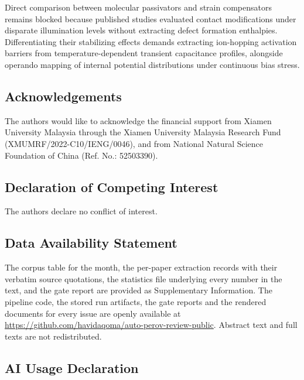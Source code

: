 \documentclass[
  11pt,
]{article}
\begin{document}
Direct comparison between molecular passivators and strain compensators
remains blocked because published studies evaluated contact
modifications under disparate illumination levels without extracting
defect formation enthalpies. Differentiating their stabilizing effects
demands extracting ion-hopping activation barriers from
temperature-dependent transient capacitance profiles, alongside operando
mapping of internal potential distributions under continuous bias
stress.

\subsection{Acknowledgements}\label{acknowledgements}

The authors would like to acknowledge the financial support from Xiamen
University Malaysia through the Xiamen University Malaysia Research Fund
(XMUMRF/2022-C10/IENG/0046), and from National Natural Science
Foundation of China (Ref. No.: 52503390).

\subsection{Declaration of Competing
Interest}\label{declaration-of-competing-interest}

The authors declare no conflict of interest.

\subsection{Data Availability
Statement}\label{data-availability-statement}

The corpus table for the month, the per-paper extraction records with
their verbatim source quotations, the statistics file underlying every
number in the text, and the gate report are provided as Supplementary
Information. The pipeline code, the stored run artifacts, the gate
reports and the rendered documents for every issue are openly available
at \url{https://github.com/havidaqoma/auto-perov-review-public}.
Abstract text and full texts are not redistributed.

\subsection{AI Usage Declaration}\label{ai-usage-declaration}
\end{document}
